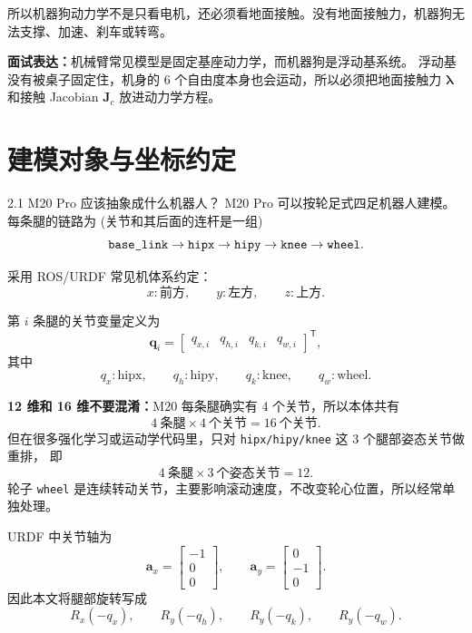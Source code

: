 \documentclass[UTF8,11pt,a4paper]{ctexart}
\newcommand{\T}{^{\mathsf T}}
\newcommand{\bs}[1]{\bm{#1}}
\newcommand{\rx}{R_x}
\newcommand{\ry}{R_y}
\begin{document}
所以机器狗动力学不是只看电机，还必须看地面接触。没有地面接触力，机器狗无法支撑、加速、刹车或转弯。

\begin{answerbox}
\textbf{面试表达：}机械臂常见模型是固定基座动力学，而机器狗是浮动基系统。
浮动基没有被桌子固定住，机身的 6 个自由度本身也会运动，所以必须把地面接触力
\(\bs\lambda\) 和接触 Jacobian \(\bs J_c\) 放进动力学方程。
\end{answerbox}

\section{建模对象与坐标约定}

\begin{conceptbox}{2.1 M20 Pro 应该抽象成什么机器人？}
M20 Pro 可以按轮足式四足机器人建模。每条腿的链路为
(关节和其后面的连杆是一组)
\[
\text{\texttt{base\_link}}
\rightarrow \text{\texttt{hipx}}
\rightarrow \text{\texttt{hipy}}
\rightarrow \text{\texttt{knee}}
\rightarrow \text{\texttt{wheel}}.
\]
\end{conceptbox}

采用 ROS/URDF 常见机体系约定：
\[
x:\text{前方}, \qquad y:\text{左方}, \qquad z:\text{上方}.
\]

第 \(i\) 条腿的关节变量定义为
\[
\bs q_i =
\begin{bmatrix}
q_{x,i} & q_{h,i} & q_{k,i} & q_{w,i}
\end{bmatrix}\T,
\]
其中
\[
q_x:\text{hipx}, \qquad
q_h:\text{hipy}, \qquad
q_k:\text{knee}, \qquad
q_w:\text{wheel}.
\]

\begin{answerbox}
\textbf{12 维和 16 维不要混淆：}M20 每条腿确实有 4 个关节，所以本体共有
\[
4\ \text{条腿}\times 4\ \text{个关节}=16\ \text{个关节}.
\]
但在很多强化学习或运动学代码里，只对 \texttt{hipx/hipy/knee} 这 3 个腿部姿态关节做重排，
即
\[
4\ \text{条腿}\times 3\ \text{个姿态关节}=12.
\]
轮子 \texttt{wheel} 是连续转动关节，主要影响滚动速度，不改变轮心位置，所以经常单独处理。
\end{answerbox}

URDF 中关节轴为
\[
\bs a_x =
\begin{bmatrix}-1\\0\\0\end{bmatrix},
\qquad
\bs a_y =
\begin{bmatrix}0\\-1\\0\end{bmatrix}.
\]
因此本文将腿部旋转写成
\[
\rx(-q_x), \qquad \ry(-q_h), \qquad \ry(-q_k), \qquad \ry(-q_w).
\]
\end{document}
